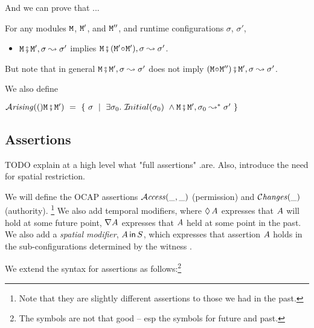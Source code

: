 And we can prove that ...

\begin{lemma}[xxx]
\label{lamma:module_pair_execution} 
For any modules ${\mbox{\tt{\ensuremath{{\mbox{\tt{M}}}}}}}$, ${\mbox{\tt{\ensuremath{{\mbox{\tt{M}}}}}}}'$, and ${\mbox{\tt{\ensuremath{{\mbox{\tt{M}}}}}}}''$, and runtime configurations $\sigma$, $\sigma'$, 

\begin{itemize}
\item
 ${\mbox{\tt{\ensuremath{{\mbox{\tt{M}}}}}}} \fatsemi {\mbox{\tt{\ensuremath{{\mbox{\tt{M}}}}}}}', \sigma \leadsto \sigma'$  implies ${\mbox{\tt{\ensuremath{{\mbox{\tt{M}}}}}}} \fatsemi ({\mbox{\tt{\ensuremath{{\mbox{\tt{M}}}}}}}'\!\circ\!{\mbox{\tt{\ensuremath{{\mbox{\tt{M}}}}}}}') ,\sigma \leadsto \sigma'$.
\end{itemize}
\end{lemma} 

But note that in general ${\mbox{\tt{\ensuremath{{\mbox{\tt{M}}}}}}} \fatsemi {\mbox{\tt{\ensuremath{{\mbox{\tt{M}}}}}}}', \sigma \leadsto \sigma'$  does not imply
$({\mbox{\tt{\ensuremath{{\mbox{\tt{M}}}}}}}\!\circ\!{\mbox{\tt{\ensuremath{{\mbox{\tt{M}}}}}}}'') \fatsemi {\mbox{\tt{\ensuremath{{\mbox{\tt{M}}}}}}}' , \sigma \leadsto \sigma'$.


We also define 
\begin{definition}
$\Arising ({\M\mkpair\M'}) \ = \ \{ \ \sigma \ \mid \ \exists \sigma_0. \  \Initial{\sigma_0} \ \wedge  \M\mkpair\M', \sigma_0 \leadsto^* \sigma' \ \} $
\end{definition}
 
 \subsection{Assertions}

TODO explain at a high level what "full assertions" .are. Also, introduce the need  for spatial restriction. 

We will define the OCAP assertions ${\mathcal{A}}\textrm{\textit{ccess}}(\_,\_)$  (permission)
and   $\mathcal{C}\textrm{\textit{hanges}}(\_)$ (authority). \footnote{Note that they are slightly different
assertions to those we had in the past.}
We also add temporal modifiers, where $\lozenge\, A$ expresses that $A$ will hold at some future point,
$\nabla A$ expresses that $A$ held at some point in the past.
We also add a {\em spatial modifier}, $A\,{\bf{\sf {in}}}\, S$, which expresses that assertion $A$ holds in
the sub-configurations determined by the witness .

We extend the syntax for assertions as follows:\footnote{The symbols are not that good -- esp the symbols for future and past.}

